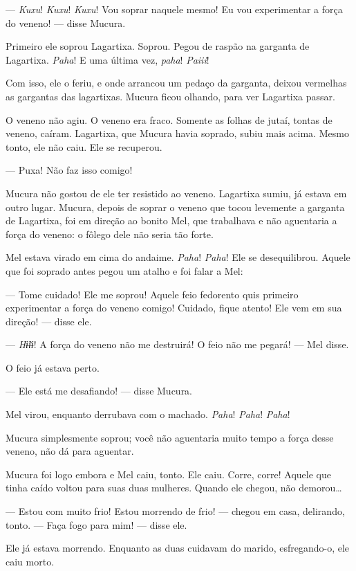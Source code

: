 --- \textit{Kuxu}! \textit{Kuxu}! \textit{Kuxu}! Vou soprar naquele mesmo! Eu vou experimentar a força do veneno! --- disse Mucura. 

Primeiro ele soprou Lagartixa. Soprou. Pegou de raspão na garganta de
Lagartixa. \textit{Paha}! E uma última vez, \textit{paha}! \textit{Paiii}!

Com isso, ele o feriu, e onde arrancou um pedaço da garganta, deixou
vermelhas as gargantas das lagartixas. Mucura ficou olhando, para ver
Lagartixa passar. 

O veneno não agiu. O veneno era fraco. Somente as folhas de jutaí,
tontas de veneno, caíram. Lagartixa, que Mucura havia soprado, subiu
mais acima. Mesmo tonto, ele não caiu. Ele se recuperou. 

--- Puxa! Não faz isso comigo! 

Mucura não gostou de ele ter resistido ao veneno. Lagartixa sumiu, já
estava em outro lugar. Mucura, depois de soprar o veneno que tocou
levemente a garganta de Lagartixa, foi em direção ao bonito Mel, que
trabalhava e não aguentaria a força do veneno: o fôlego dele não seria
tão forte. 

Mel estava virado em cima do andaime. \textit{Paha}! \textit{Paha}! Ele se
desequilibrou. Aquele que foi soprado antes pegou um atalho e foi falar
a Mel: 

--- Tome cuidado! Ele me soprou! Aquele feio fedorento quis primeiro
experimentar a força do veneno comigo! Cuidado, fique atento! Ele vem em
sua direção! --- disse ele. 

--- \textit{Hɨ̃ɨɨ}! A força do veneno não me destruirá! O feio não me
pegará! --- Mel disse. 

O feio já estava perto.

--- Ele está me desafiando! --- disse Mucura. 

Mel virou, enquanto derrubava com o machado. \textit{Paha}! \textit{Paha}! \textit{Paha}!

Mucura simplesmente soprou; você não aguentaria muito tempo a força
desse veneno, não dá para aguentar. 

Mucura foi logo embora e Mel caiu, tonto. Ele caiu. Corre, corre! Aquele
que tinha caído voltou para suas duas mulheres. Quando ele chegou, não
demorou…

 --- Estou com muito frio! Estou morrendo de frio! --- chegou em casa,
delirando, tonto. --- Faça fogo para mim! --- disse ele. 

Ele já estava morrendo. Enquanto as duas cuidavam do marido,
esfregando-o, ele caiu morto. 

